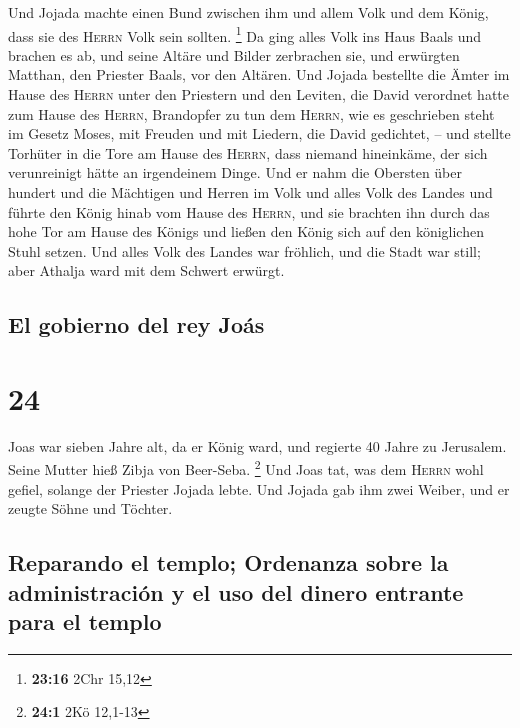  Und Jojada machte einen Bund zwischen ihm und allem Volk
und dem König, dass sie des \textsc{Herrn} Volk sein sollten.
\footnote{\textbf{23:16} 2Chr 15,12}  Da ging alles Volk
ins Haus Baals und brachen es ab, und seine Altäre und Bilder zerbrachen
sie, und erwürgten Matthan, den Priester Baals, vor den Altären.
 Und Jojada bestellte die Ämter im Hause des
\textsc{Herrn} unter den Priestern und den Leviten, die David verordnet
hatte zum Hause des \textsc{Herrn}, Brandopfer zu tun dem
\textsc{Herrn}, wie es geschrieben steht im Gesetz Moses, mit Freuden
und mit Liedern, die David gedichtet, --  und stellte
Torhüter in die Tore am Hause des \textsc{Herrn}, dass niemand
hineinkäme, der sich verunreinigt hätte an irgendeinem Dinge.
 Und er nahm die Obersten über hundert und die Mächtigen
und Herren im Volk und alles Volk des Landes und führte den König hinab
vom Hause des \textsc{Herrn}, und sie brachten ihn durch das hohe Tor am
Hause des Königs und ließen den König sich auf den königlichen Stuhl
setzen.  Und alles Volk des Landes war fröhlich, und die
Stadt war still; aber Athalja ward mit dem Schwert erwürgt.

\hypertarget{el-gobierno-del-rey-jouxe1s}{%
\subsection{El gobierno del rey
Joás}\label{el-gobierno-del-rey-jouxe1s}}

\hypertarget{section-23}{%
\section{24}\label{section-23}}

 Joas war sieben Jahre alt, da er König ward, und regierte
40 Jahre zu Jerusalem. Seine Mutter hieß Zibja von Beer-Seba.
\footnote{\textbf{24:1} 2Kö 12,1-13}  Und Joas tat, was
dem \textsc{Herrn} wohl gefiel, solange der Priester Jojada lebte.
 Und Jojada gab ihm zwei Weiber, und er zeugte Söhne und
Töchter.

\hypertarget{reparando-el-templo-ordenanza-sobre-la-administraciuxf3n-y-el-uso-del-dinero-entrante-para-el-templo}{%
\subsection{Reparando el templo; Ordenanza sobre la administración y el
uso del dinero entrante para el
templo}\label{reparando-el-templo-ordenanza-sobre-la-administraciuxf3n-y-el-uso-del-dinero-entrante-para-el-templo}}


